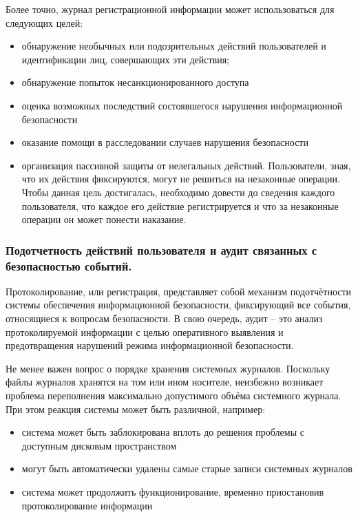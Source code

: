 Более точно, журнал регистрационной информации может использоваться для следующих целей:
\begin{itemize}
    \item обнаружение необычных или подозрительных действий пользователей и идентификации лиц, совершающих эти действия;
    \item обнаружение попыток несанкционированного доступа
    \item оценка возможных последствий состоявшегося нарушения информационной безопасности
    \item оказание помощи в расследовании случаев нарушения безопасности
    \item организация пассивной защиты от нелегальных действий. Пользователи, зная, что их действия фиксируются, могут не решиться на незаконные операции. Чтобы данная цель достигалась, необходимо довести до сведения каждого пользователя, что каждое его действие регистрируется и что за незаконные операции он может понести наказание.
\end{itemize}



\subsubsection{Подотчетность действий пользователя и аудит связанных с безопасностью событий.}
Протоколирование, или регистрация, представляет собой механизм подотчётности системы обеспечения информационной безопасности, фиксирующий все события, относящиеся к вопросам безопасности. В свою очередь, аудит – это анализ протоколируемой информации с целью оперативного выявления и предотвращения нарушений режима информационной безопасности.

Не менее важен вопрос о порядке хранения системных журналов. Поскольку файлы журналов хранятся на том или ином носителе, неизбежно возникает проблема переполнения максимально допустимого объёма системного журнала. При этом реакция системы может быть различной, например:
\begin{itemize}
    \item система может быть заблокирована вплоть до решения проблемы с доступным дисковым пространством
    \item могут быть автоматически удалены самые старые записи системных журналов
    \item система может продолжить функционирование, временно приостановив протоколирование информации
\end{itemize}

